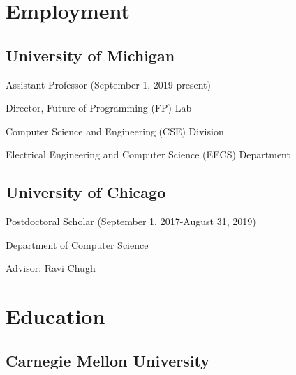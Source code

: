 \documentclass[10pt,letterpaper]{article}
\renewenvironment{itemize}{
  \begin{list}{}{
    \setlength{\leftmargin}{1.25em}
    \setlength{\itemsep}{0.25em}
    \setlength{\parskip}{0pt}
    \setlength{\parsep}{0.2em}
  }
}{
  \end{list}
}
\begin{document}
\section*{Employment}

\subsection*{University of Michigan}
  \begin{itemize}
    \item Assistant Professor (September 1, 2019-present)
    \item Director, Future of Programming (FP) Lab
    \item Computer Science and Engineering (CSE) Division
    \item Electrical Engineering and Computer Science (EECS) Department
  \end{itemize}

\subsection*{University of Chicago}
  \begin{itemize}
    \item Postdoctoral Scholar (September 1, 2017-August 31, 2019)
    \item Department of Computer Science
    \item Advisor: Ravi Chugh
  \end{itemize}


\section*{Education}

\subsection*{Carnegie Mellon University}
\end{document}
